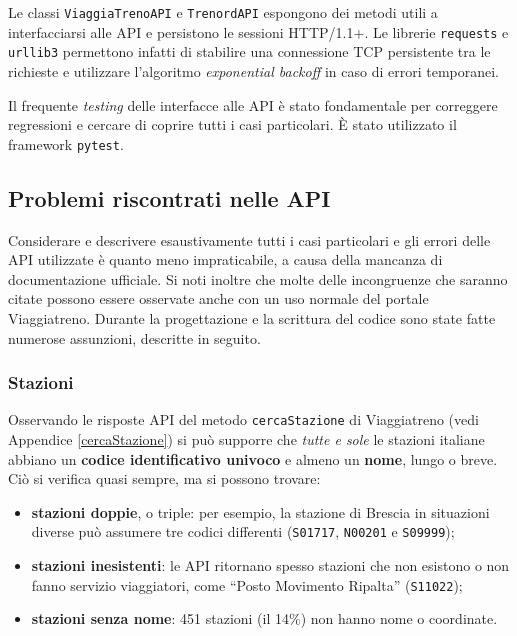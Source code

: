 \documentclass[12pt,italian]{report}
\begin{document}
Le classi \texttt{ViaggiaTrenoAPI} e \texttt{TrenordAPI} espongono dei
metodi utili a interfacciarsi alle API e persistono le sessioni
HTTP/1.1+.  Le librerie \texttt{requests} e \texttt{urllib3}
permettono infatti di stabilire una connessione TCP persistente tra le
richieste e utilizzare l'algoritmo \textit{exponential backoff} in
caso di errori temporanei.

Il frequente \textit{testing} delle interfacce alle API è stato
fondamentale per correggere regressioni e cercare di coprire tutti i
casi particolari.  È stato utilizzato il framework \texttt{pytest}.

\subsection{Problemi riscontrati nelle API}

Considerare e descrivere esaustivamente tutti i casi particolari e gli
errori delle API utilizzate è quanto meno impraticabile, a causa della
mancanza di documentazione ufficiale.  Si noti inoltre che molte delle
incongruenze che saranno citate possono essere osservate anche con un
uso normale del portale Viaggiatreno.  Durante la progettazione e la
scrittura del codice sono state fatte numerose assunzioni, descritte
in seguito.

\subsubsection{Stazioni}

Osservando le risposte API del metodo \texttt{cercaStazione} di
Viaggiatreno (vedi Appendice \ref{cercaStazione}) si può supporre che
\textit{tutte e sole} le stazioni italiane abbiano un \textbf{codice
    identificativo univoco} e almeno un \textbf{nome}, lungo o breve.
Ciò si verifica quasi sempre, ma si possono trovare:
\begin{itemize}
    \item \textbf{stazioni doppie}, o triple: per esempio, la stazione
    di Brescia in situazioni diverse può assumere tre codici
    differenti (\texttt{S01717}, \texttt{N00201} e \texttt{S09999});
    \item \textbf{stazioni inesistenti}: le API ritornano spesso
    stazioni che non esistono o non fanno servizio viaggiatori, come
    ``Posto Movimento Ripalta'' (\texttt{S11022});
    \item \textbf{stazioni senza nome}: 451 stazioni (il 14\%) non
    hanno nome o coordinate.
\end{itemize}
\end{document}
